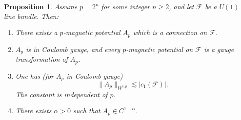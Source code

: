 \documentclass[reqno,11pt]{amsart}
\newtheorem{proposition}[theorem]{Proposition}
\theoremstyle{definition}
\numberwithin{equation}{section}
\begin{document}
\begin{proposition}\label{existence for p}
Assume $p = 2^n$ for some integer $n \geq 2$, and let $\mathscr F$ be a $U(1)$ line bundle.
Then:
\begin{enumerate}
\item There exists a $p$-magnetic potential $A_p$ which is a connection on $\mathscr F$.
\item $A_p$ is in Coulomb gauge, and every $p$-magnetic potential on $\mathscr F$ is a gauge transformation of $A_p$.
\item One has (for $A_p$ in Coulomb gauge)
\begin{equation}\label{Sobolev bounds for p}
	\|A_p\|_{W^{1, p}} \lesssim |c_1(\mathscr F)|.
\end{equation}
The constant is independent of $p$.
\item There exists $\alpha > 0$ such that $A_p \in C^{1 + \alpha}$.
\end{enumerate}
\end{proposition}
\end{document}
